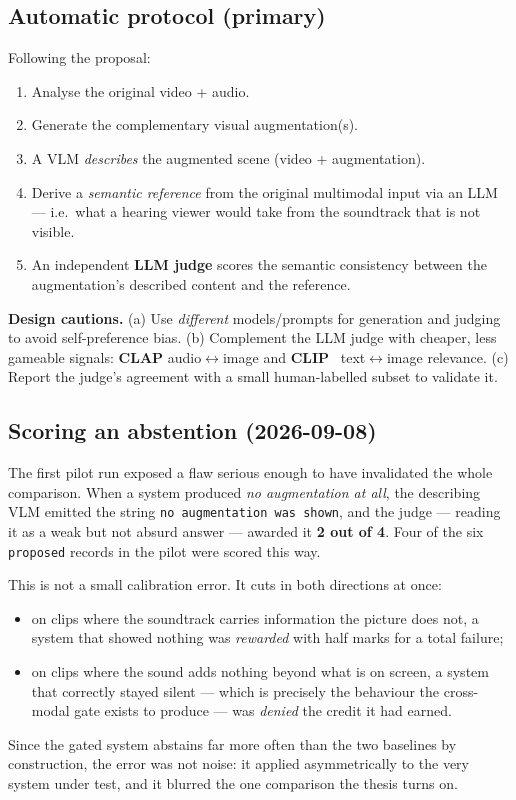 \documentclass[11pt,a4paper]{article}
\begin{document}
\subsection{Automatic protocol (primary)}
Following the proposal:
\begin{enumerate}
  \item Analyse the original video + audio.
  \item Generate the complementary visual augmentation(s).
  \item A VLM \emph{describes} the augmented scene (video + augmentation).
  \item Derive a \emph{semantic reference} from the original multimodal input via an LLM --- i.e.\
    what a hearing viewer would take from the soundtrack that is not visible.
  \item An independent \textbf{LLM judge} scores the semantic consistency between the augmentation's
    described content and the reference.
\end{enumerate}
\textbf{Design cautions.} (a) Use \emph{different} models/prompts for generation and judging to
avoid self-preference bias. (b) Complement the LLM judge with cheaper, less gameable signals:
\textbf{CLAP} audio$\leftrightarrow$image and \textbf{CLIP}~\cite{clip} text$\leftrightarrow$image
relevance. (c) Report the judge's agreement with a small human-labelled subset to validate it.

\subsection{Scoring an abstention (2026-09-08)}\label{sec:abstain}
The first pilot run exposed a flaw serious enough to have invalidated the whole comparison. When a
system produced \emph{no augmentation at all}, the describing VLM emitted the string \texttt{no
augmentation was shown}, and the judge --- reading it as a weak but not absurd answer --- awarded it
\textbf{2 out of 4}. Four of the six \texttt{proposed} records in the pilot were scored this way.

This is not a small calibration error. It cuts in both directions at once:
\begin{itemize}
  \item on clips where the soundtrack carries information the picture does not, a system that showed
    nothing was \emph{rewarded} with half marks for a total failure;
  \item on clips where the sound adds nothing beyond what is on screen, a system that correctly
    stayed silent --- which is precisely the behaviour the cross-modal gate exists to produce ---
    was \emph{denied} the credit it had earned.
\end{itemize}
Since the gated system abstains far more often than the two baselines by construction, the error
was not noise: it applied asymmetrically to the very system under test, and it blurred the one
comparison the thesis turns on.
\end{document}
